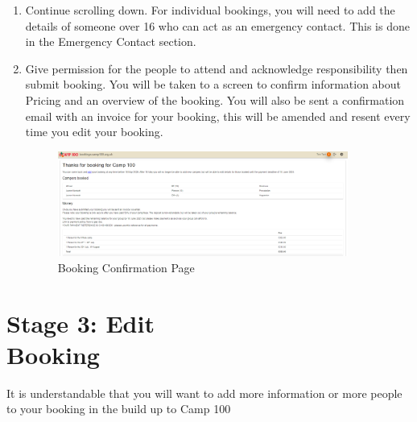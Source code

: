 \documentclass[a4paper, 11pt]{report}
\begin{document}
\begin{enumerate}
    \item Continue scrolling down. For individual bookings, you will need to add the details of someone over 16 who can act as an emergency contact. This is done in the Emergency Contact section.
    \item Give permission for the people to attend and acknowledge responsibility then submit booking. You will be taken to a screen to confirm information about Pricing and an overview of the booking. You will also be sent a confirmation email with an invoice for your booking, this will be amended and resent every time you edit your booking. 
    \begin{figure}[H]
        \centering
        \includegraphics[width=0.9\textwidth]{assets/2-booking-confirmation.png}
        \caption{Booking Confirmation Page}
    \end{figure}
    
\end{enumerate}


\chapter[Stage 3: Edit Bookings]{Stage 3: Edit\\ Booking}
\label{chap:edit}

It is understandable that you will want to add more information or more people to your booking in the build up to Camp 100 
\end{document}
